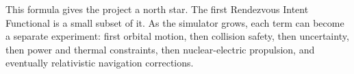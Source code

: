 \documentclass[11pt]{article}
\begin{document}
This formula gives the project a north star.
The first Rendezvous Intent Functional is a small subset of it.
As the simulator grows, each term can become a separate experiment: first orbital motion, then collision safety, then uncertainty, then power and thermal constraints, then nuclear-electric propulsion, and eventually relativistic navigation corrections.
\end{document}
